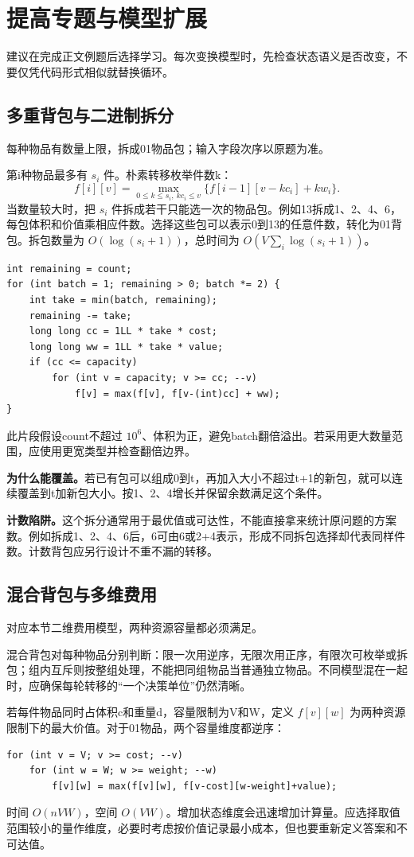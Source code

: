 \appendix
\section{提高专题与模型扩展}
建议在完成正文例题后选择学习。每次变换模型时，先检查状态语义是否改变，不要仅凭代码形式相似就替换循环。

\subsection{多重背包与二进制拆分}
每种物品有数量上限，拆成01物品包；输入字段次序以原题为准。

第i种物品最多有 $s_i$ 件。朴素转移枚举件数k：
\[f[i][v]=\max_{0\le k\le s_i,\ kc_i\le v}\{f[i-1][v-kc_i]+kw_i\}.\]
当数量较大时，把 $s_i$ 件拆成若干只能选一次的物品包。例如13拆成1、2、4、6，每包体积和价值乘相应件数。选择这些包可以表示0到13的任意件数，转化为01背包。拆包数量为 $O(\log(s_i+1))$，总时间为 $O(V\sum_i\log(s_i+1))$。

\begin{lstlisting}
int remaining = count;
for (int batch = 1; remaining > 0; batch *= 2) {
    int take = min(batch, remaining);
    remaining -= take;
    long long cc = 1LL * take * cost;
    long long ww = 1LL * take * value;
    if (cc <= capacity)
        for (int v = capacity; v >= cc; --v)
            f[v] = max(f[v], f[v-(int)cc] + ww);
}
\end{lstlisting}
此片段假设count不超过 $10^6$、体积为正，避免batch翻倍溢出。若采用更大数量范围，应使用更宽类型并检查翻倍边界。

\textbf{为什么能覆盖。}若已有包可以组成0到t，再加入大小不超过t+1的新包，就可以连续覆盖到t加新包大小。按1、2、4增长并保留余数满足这个条件。

\textbf{计数陷阱。}这个拆分通常用于最优值或可达性，不能直接拿来统计原问题的方案数。例如拆成1、2、4、6后，6可由6或2+4表示，形成不同拆包选择却代表同样件数。计数背包应另行设计不重不漏的转移。

\subsection{混合背包与多维费用}
对应本节二维费用模型，两种资源容量都必须满足。

混合背包对每种物品分别判断：限一次用逆序，无限次用正序，有限次可枚举或拆包；组内互斥则按整组处理，不能把同组物品当普通独立物品。不同模型混在一起时，应确保每轮转移的“一个决策单位”仍然清晰。

若每件物品同时占体积c和重量d，容量限制为V和W，定义 $f[v][w]$ 为两种资源限制下的最大价值。对于01物品，两个容量维度都逆序：
\begin{lstlisting}
for (int v = V; v >= cost; --v)
    for (int w = W; w >= weight; --w)
        f[v][w] = max(f[v][w], f[v-cost][w-weight]+value);
\end{lstlisting}
时间 $O(nVW)$，空间 $O(VW)$。增加状态维度会迅速增加计算量。应选择取值范围较小的量作维度，必要时考虑按价值记录最小成本，但也要重新定义答案和不可达值。


